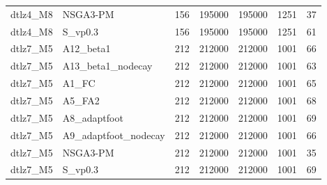 \begin{tabular}{llrrrrr}
dtlz4_M8 & NSGA3-PM & 156 & 195000 & 195000 & 1251 & 37 \\
dtlz4_M8 & S_vp0.3 & 156 & 195000 & 195000 & 1251 & 61 \\
dtlz7_M5 & A12_beta1 & 212 & 212000 & 212000 & 1001 & 66 \\
dtlz7_M5 & A13_beta1_nodecay & 212 & 212000 & 212000 & 1001 & 63 \\
dtlz7_M5 & A1_FC & 212 & 212000 & 212000 & 1001 & 65 \\
dtlz7_M5 & A5_FA2 & 212 & 212000 & 212000 & 1001 & 68 \\
dtlz7_M5 & A8_adaptfoot & 212 & 212000 & 212000 & 1001 & 69 \\
dtlz7_M5 & A9_adaptfoot_nodecay & 212 & 212000 & 212000 & 1001 & 66 \\
dtlz7_M5 & NSGA3-PM & 212 & 212000 & 212000 & 1001 & 35 \\
dtlz7_M5 & S_vp0.3 & 212 & 212000 & 212000 & 1001 & 69 \\
\bottomrule
\end{tabular}
